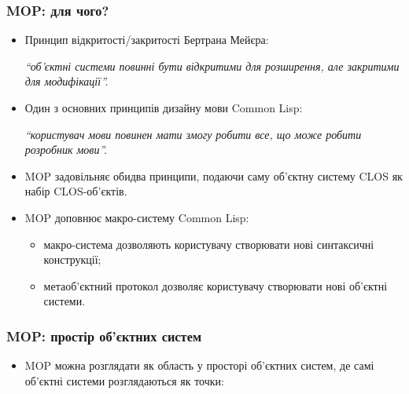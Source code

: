 \documentclass{beamer}
\begin{document}
\begin{frame}[fragile]
  \frametitle{MOP: для чого?}
  \begin{itemize}
  \item Принцип відкритості/закритості Бертрана Мейєра:
    \par\textit{``об'єктні системи повинні бути відкритими для розширення, але
      закритими для модифікації''.}
  \item Один з основних принципів дизайну мови Common Lisp:
    \par\textit{``користувач мови повинен мати змогу робити все, що може робити
      розробник мови''.}
  \item MOP задовільняє обидва принципи, подаючи саму об'єктну систему CLOS як
    набір CLOS-об'єктів.
  \item MOP доповнює макро-систему Common Lisp:
    \begin{itemize}
    \item макро-система дозволяють користувачу створювати нові синтаксичні
      конструкції;
    \item метаоб'єктний протокол дозволяє користувачу створювати нові об'єктні
      системи.
    \end{itemize}
  \end{itemize}
\end{frame}

\begin{frame}[fragile]
  \frametitle{MOP: простір об'єктних систем}
  \begin{itemize}
  \item MOP можна розглядати як область у просторі об'єктних систем, де самі
    об'єктні системи розглядаються як точки:
  \end{itemize}
  \begin{center}
  \end{center}
\end{frame}
\end{document}
